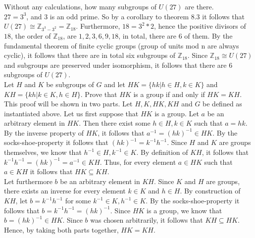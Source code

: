 \documentclass{article}
\newcommand{\Z}{\mathbb{Z}}
\begin{document}
 Without any calculations, how many subgroups of $U(27)$ are there. \\

 $27 = 3^3$, and $3$ is an odd prime. So by a corollary to theorem 8.3 it follows that $U(27) \cong \Z_{3^3-3^2} = \Z_{18}$. Furthermore, $18 = 3^2*2$, hence the positive divisors of $18$, the order of $\Z_{18}$, are $1,2,3,6,9,18$, in total, there are $6$ of them. By the fundamental theorem of finite cyclic groups (group of units mod n are always cyclic), it follows that there are in total six subgroups of $\Z_{18}$. Since $\Z_{18}\cong U(27)$ and subgroups are preserved under isomorphism, it follows that there are $6$ subgroups of $U(27)$.\\

 Let $H$ and $K$ be subgroups of $G$ and let $HK=\{hk|h\in H, k\in K\}$ and $KH=\{kh|k\in K, h\in H\}$. Prove that $HK$ is a group if and only if $HK=KH$. \\

 This proof will be shown in two parts. Let $H, K, HK, KH$ and $G$ be defined as instantiated above. Let us first suppose that $HK$ is a group. Let $a$ be an arbitrary element in $HK$. Then there exist some $h \in H, k \in K$ such that $a=hk$. By the inverse property of $HK$, it follows that $a^{-1}=(hk)^{-1} \in HK$. By the socks-shoe-property it follows that $(hk)^{-1}=k^{-1}h^{-1}$. Since $H$ and $K$ are groups themselves, we know that $h^{-1} \in H, k^{-1} \in K$. By definition of $KH$, it follows that $k^{-1}h^{-1}=(hk)^{-1}=a^{-1} \in KH$. Thus, for every element $a \in HK$ such that $a \in KH$ it follows that $HK \subseteq KH$. \\

Let furthermore $b$ be an arbitrary element in $KH$. Since $K$ and $H$ are groups, there exists an inverse for every element $k \in K$ and $h \in H$. By construction of $KH$, let $b=k^{-1}h^{-1}$ for some $k^{-1} \in K, h^{-1} \in K$. By the socks-shoe-property it follows that $b=k^{-1}h^{-1}=(hk)^{-1}$. Since $HK$ is a group, we know that $b=(hk)^{-1} \in HK$. Since $b$ was chosen arbitrarily, it follows that $KH \subseteq HK$. Hence, by taking both parts together, $HK=KH$. \\
\end{document}
